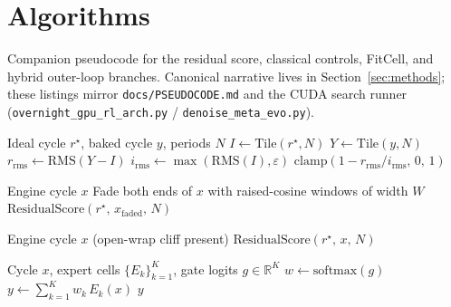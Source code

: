\section{Algorithms}
\label{app:algorithms}

Companion pseudocode for the residual score, classical controls, FitCell, and hybrid outer-loop branches.
Canonical narrative lives in Section~\ref{sec:methods}; these listings mirror
\texttt{docs/PSEUDOCODE.md} and the CUDA search runner
(\texttt{overnight\_gpu\_rl\_arch.py} / \texttt{denoise\_meta\_evo.py}).

\begin{algorithm}[t]
\caption{ResidualScore}
\label{alg:residual}
\begin{algorithmic}[1]
\Require Ideal cycle $r^{\star}$, baked cycle $y$, periods $N$
\State $I \gets \mathrm{Tile}(r^{\star}, N)$
\State $Y \gets \mathrm{Tile}(y, N)$
\State $r_{\mathrm{rms}} \gets \mathrm{RMS}(Y-I)$
\State $i_{\mathrm{rms}} \gets \max(\mathrm{RMS}(I), \varepsilon)$
\State \Return $\mathrm{clamp}(1 - r_{\mathrm{rms}}/i_{\mathrm{rms}},\,0,\,1)$
\end{algorithmic}
\end{algorithm}

\begin{algorithm}[t]
\caption{DualCosine baseline}
\label{alg:dualcosine}
\begin{algorithmic}[1]
\Require Engine cycle $x$
\State Fade both ends of $x$ with raised-cosine windows of width $W$
\State \Return $\mathrm{ResidualScore}(r^{\star},\,x_{\mathrm{faded}},\,N)$
\end{algorithmic}
\end{algorithm}

\begin{algorithm}[t]
\caption{No-bake (passthrough) control}
\label{alg:no-bake}
\begin{algorithmic}[1]
\Require Engine cycle $x$ (open-wrap cliff present)
\State \Return $\mathrm{ResidualScore}(r^{\star},\,x,\,N)$ 
\end{algorithmic}
\end{algorithm}

\begin{algorithm}[t]
\caption{MoE soft gating over bake experts}
\label{alg:moe}
\begin{algorithmic}[1]
\Require Cycle $x$, expert cells $\{E_k\}_{k=1}^{K}$, gate logits $g\in\mathbb{R}^{K}$
\State $w \gets \mathrm{softmax}(g)$
\State $y \gets \sum_{k=1}^{K} w_k\, E_k(x)$
\State \Return $y$
\end{algorithmic}
\end{algorithm}


